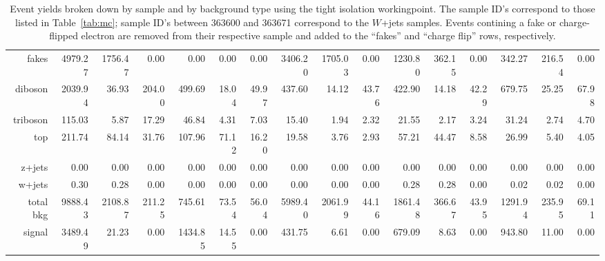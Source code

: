 \begin{sidewaystable}[!htbp]
{\begin{tabular}{r|rrr|rrr|rrr|rrr|rrr}
      fakes&4979.27&1756.47&0.00&0.00&0.00&0.00&3406.20&1705.03&0.00&1230.80&362.15&0.00&342.27&216.54&0.00\\

      diboson&2039.94&36.93&204.00&499.69&18.04&49.97&437.60&14.12&43.76&422.90&14.18&42.29&679.75&25.25&67.98\\

      triboson&115.03&5.87&17.29&46.84&4.31&7.03&15.40&1.94&2.32&21.55&2.17&3.24&31.24&2.74&4.70\\

      top&211.74&84.14&31.76&107.96&71.12&16.20&19.58&3.76&2.93&57.21&44.47&8.58&26.99&5.40&4.05\\

      z+jets&0.00&0.00&0.00&0.00&0.00&0.00&0.00&0.00&0.00&0.00&0.00&0.00&0.00&0.00&0.00\\

      w+jets&0.30&0.28&0.00&0.00&0.00&0.00&0.00&0.00&0.00&0.28&0.28&0.00&0.02&0.02&0.00\\
      \hline
      total bkg&9888.43&2108.87&211.25&745.61&73.54&56.04&5989.40&2061.99&44.16&1861.48&366.67&43.95&1291.94&235.95&69.11\\
      signal&3489.49&21.23&0.00&1434.85&14.55&0.00&431.75&6.61&0.00&679.09&8.63&0.00&943.80&11.00&0.00\\
      \hline\hline
    \end{tabular}
  }
  \caption{Event yields broken down by sample and by background type using the tight isolation workingpoint.  The sample ID's correspond to those listed in Table~\ref{tab:mc}; sample ID's between 363600 and 363671 correspond to the $W$+jets samples.  Events contining a fake or charge-flipped electron are removed from their respective sample and added to the ``fakes'' and ``charge flip'' rows, respectively.}
  \label{tab:EY_tight}
\end{sidewaystable}
